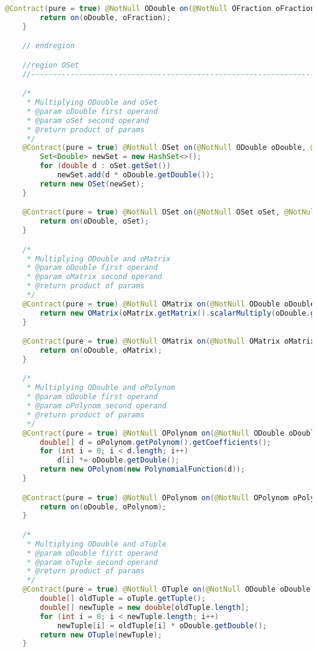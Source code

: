 \begin{lstlisting}[caption=Times (Falk),label=list:Times,language=Java]
    @Contract(pure = true) @NotNull ODouble on(@NotNull OFraction oFraction, @NotNull ODouble oDouble) {
        return on(oDouble, oFraction);
    }

    // endregion

    //region OSet
    //------------------------------------------------------------------------------------

    /*
     * Multiplying ODouble and oSet
     * @param oDouble first operand
     * @param oSet second operand
     * @return product of params
     */
    @Contract(pure = true) @NotNull OSet on(@NotNull ODouble oDouble, @NotNull OSet oSet) {
        Set<Double> newSet = new HashSet<>();
        for (double d : oSet.getSet())
            newSet.add(d * oDouble.getDouble());
        return new OSet(newSet);
    }

    @Contract(pure = true) @NotNull OSet on(@NotNull OSet oSet, @NotNull ODouble oDouble) {
        return on(oDouble, oSet);
    }

    /*
     * Multiplying ODouble and oMatrix
     * @param oDouble first operand
     * @param oMatrix second operand
     * @return product of params
     */
    @Contract(pure = true) @NotNull OMatrix on(@NotNull ODouble oDouble, @NotNull OMatrix oMatrix) {
        return new OMatrix(oMatrix.getMatrix().scalarMultiply(oDouble.getDouble()));
    }

    @Contract(pure = true) @NotNull OMatrix on(@NotNull OMatrix oMatrix, @NotNull ODouble oDouble) {
        return on(oDouble, oMatrix);
    }

    /*
     * Multiplying ODouble and oPolynom
     * @param oDouble first operand
     * @param oPolynom second operand
     * @return product of params
     */
    @Contract(pure = true) @NotNull OPolynom on(@NotNull ODouble oDouble, @NotNull OPolynom oPolynom) {
        double[] d = oPolynom.getPolynom().getCoefficients();
        for (int i = 0; i < d.length; i++)
            d[i] *= oDouble.getDouble();
        return new OPolynom(new PolynomialFunction(d));
    }

    @Contract(pure = true) @NotNull OPolynom on(@NotNull OPolynom oPolynom, @NotNull ODouble oDouble) {
        return on(oDouble, oPolynom);
    }

    /*
     * Multiplying ODouble and oTuple
     * @param oDouble first operand
     * @param oTuple second operand
     * @return product of params
     */
    @Contract(pure = true) @NotNull OTuple on(@NotNull ODouble oDouble, @NotNull OTuple oTuple) {
        double[] oldTuple = oTuple.getTuple();
        double[] newTuple = new double[oldTuple.length];
        for (int i = 0; i < newTuple.length; i++)
            newTuple[i] = oldTuple[i] * oDouble.getDouble();
        return new OTuple(newTuple);
    }


\end{lstlisting}
